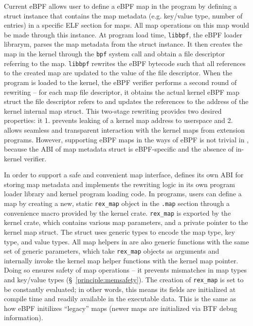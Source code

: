 Current eBPF allows user to define a eBPF map in the program by defining a
    struct instance that contains the map metadata (e.g. key/value type, number
    of entries) in a specific ELF section for maps.
All map operations on this map would be made through this instance.
At program load time, \texttt{libbpf}, the eBPF loader librarym, parses the map
    metadata from the struct instance.
It then creates the map in the kernel through the \texttt{bpf} system call and
    obtain a file descriptor referring to the map.
\texttt{libbpf} rewrites the eBPF bytecode such that all references to the
    created map are updated to the value of the file descriptor.
When the program is loaded to the kernel, the eBPF verifier performs a second
    round of rewriting -- for each map file descriptor, it obtains the actual
    kernel eBPF map struct the file descriptor refers to and updates the
    references to the address of the kernel internal map struct.
This two-stage rewriting provides two desired properties: it 1. prevents
    leaking of a kernel map address to userspace and 2. allows seamless and
    transparent interaction with the kernel maps from extension programs.
However, supporting eBPF maps in the ways of eBPF is not trivial in
    \projname{}, because the ABI of map metadata struct is eBPF-specific and
    the absence of in-kernel verifier.

In order to support a safe and convenient map interface, \projname{} defines
    its own ABI for storing map metadata and implements the rewriting logic in
    its own program loader library and kernel program loading code.
In \projname{} programs, users can define a map by creating a new, static
    \texttt{rex\_map} object in the \texttt{.map} section through a convenience
    macro provided by the \projname{} kernel crate.
\texttt{rex\_map} is exported by the \projname{} kernel crate, which contains
    various map parameters, and a private pointer to the kernel map struct.
The struct uses generic types to encode the map type, key type, and
    value types.
All map helpers in \projname{} are also generic functions with the same set of
    generic parameters, which take \texttt{rex\_map} objects as arguments and
    internally invoke the kernel map helper functions with the kernel map
    pointer.
Doing so ensures safety of map operations -- it prevents mismatches in map
    types and key/value types (\S~\ref{principle:memsafety}).
The creation of \texttt{rex\_map} is set to be constantly evaluated; in other
    words, this means its fields are initialized at compile time and readily
    available in the executable data.
This is the same as how eBPF initilizes ``legacy'' maps (newer maps are
    initialized via BTF debug information).

